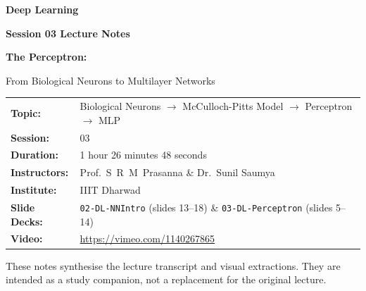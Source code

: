 \documentclass[12pt,a4paper]{article}
\begin{document}

\begin{titlepage}
  \centering
  \vspace*{2cm}

  {\Huge\bfseries Deep Learning\par}
  \vspace{0.4cm}
  {\Large\bfseries Session 03 Lecture Notes\par}
  \vspace{1.2cm}


  \vspace{1.0cm}
  {\LARGE\bfseries The Perceptron:\par}
  \vspace{0.3cm}
  {\large From Biological Neurons to Multilayer Networks\par}
  \vspace{1.5cm}

  \begin{tabular}{ll}
    \textbf{Topic:}       & Biological Neurons $\to$ McCulloch-Pitts Model $\to$
                            Perceptron $\to$ MLP \\[4pt]
    \textbf{Session:}     & 03 \\[4pt]
    \textbf{Duration:}    & 1 hour 26 minutes 48 seconds \\[4pt]
    \textbf{Instructors:} & Prof.\ S~R~M~Prasanna \& Dr.\ Sunil Saumya \\[4pt]
    \textbf{Institute:}   & IIIT Dharwad \\[4pt]
    \textbf{Slide Decks:} & \texttt{02-DL-NNIntro} (slides 13--18)
                            \& \texttt{03-DL-Perceptron} (slides 5--14) \\[4pt]
    \textbf{Video:}       & \url{https://vimeo.com/1140267865} \\
  \end{tabular}

  \vspace{2cm}


  \vfill
  {\small These notes synthesise the lecture transcript and visual extractions.
  They are intended as a study companion, not a replacement for the original lecture.}
\end{titlepage}
\end{document}
